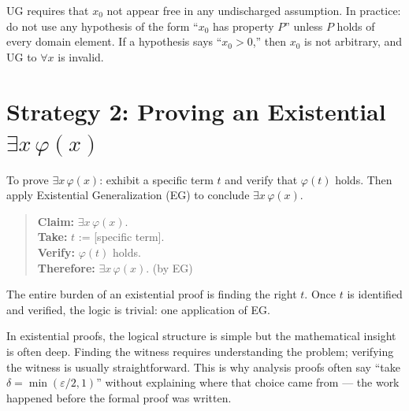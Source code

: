 \begin{remark*}
UG requires that $x_0$ not appear free in any undischarged assumption. In
practice: do not use any hypothesis of the form ``$x_0$ has property $P$''
unless $P$ holds of every domain element. If a hypothesis says ``$x_0 > 0$,''
then $x_0$ is not arbitrary, and UG to $\forall x$ is invalid.
\end{remark*}


\section*{Strategy 2: Proving an Existential $\exists x\,\varphi(x)$}

\begin{exposition}
To prove $\exists x\,\varphi(x)$: exhibit a specific term $t$ and verify that
$\varphi(t)$ holds. Then apply Existential Generalization (EG) to conclude
$\exists x\,\varphi(x)$.
\end{exposition}

\begin{quote}
\textbf{Claim:} $\exists x\,\varphi(x)$.\\
\textbf{Take:} $t$ := [specific term].\\
\textbf{Verify:} $\varphi(t)$ holds. \\
\textbf{Therefore:} $\exists x\,\varphi(x)$. \quad (by EG)
\end{quote}

\begin{exposition}
The entire burden of an existential proof is finding the right $t$. Once $t$
is identified and verified, the logic is trivial: one application of EG.
\end{exposition}

\begin{remark*}
In existential proofs, the logical structure is simple but the mathematical
insight is often deep. Finding the witness requires understanding the problem;
verifying the witness is usually straightforward. This is why analysis proofs
often say ``take $\delta = \min(\varepsilon/2, 1)$'' without explaining where
that choice came from --- the work happened before the formal proof was written.
\end{remark*}

